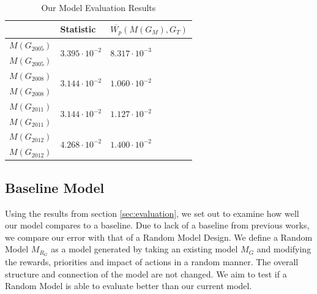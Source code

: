 {\begin{table}[!th]
	
	\caption{Our Model Evaluation Results}	
	\begin{tabular}{|l|l|l|}
		\hline
		& Statistic & $\overline{W_p}(M(G_{M}),G_{{T}})$\\
		
		\hline			
		$M(G_{2005})$    &      \multirow{2}{*}{ $3.395\cdot10^{-2}$ } & \multirow{2}{*}{$8.317\cdot10^{-3}$}            \\ 
		
		$M(G_{2005})$            & &   \\     
		\hline
		$M(G_{2008})$             &      \multirow{2}{*}{ $3.144\cdot10^{-2}$ }  &  \multirow{2}{*}{$1.060\cdot10^{-2}$}         \\ 
		
		$M(G_{2008})$                &   & \\     
		\hline
		$M(G_{2011})$           &      \multirow{2}{*}{ $3.144\cdot10^{-2}$ }    & \multirow{2}{*}{$1.127\cdot10^{-2}$}          \\ 
		
		$M(G_{2011})$            &    &\\     
		\hline	
		
		$M(G_{2012})$              &      \multirow{2}{*}{ $4.268\cdot10^{-2}$ }    &     \multirow{2}{*}{$1.400\cdot10^{-2}$}       \\ 
		
		$M(G_{2012})$           &   & \\     
		\hline						
	\end{tabular}\label{tab:evaluation}

\end{table}

\subsection{Baseline Model}\label{sec:random}

Using the results from section \ref{sec:evaluation}, we set out to examine how well our model compares to a baseline. Due to lack of a baseline from previous works, we compare our error with that of a Random Model Design. We define a Random Model $M_{R_G}$ as a model generated by taking an existing model $M_G$ and modifying the rewards, priorities and impact of actions in a random manner. The overall structure and connection of the model are not changed. We aim to test if a Random Model is able to evaluate better than our current model. 

}
